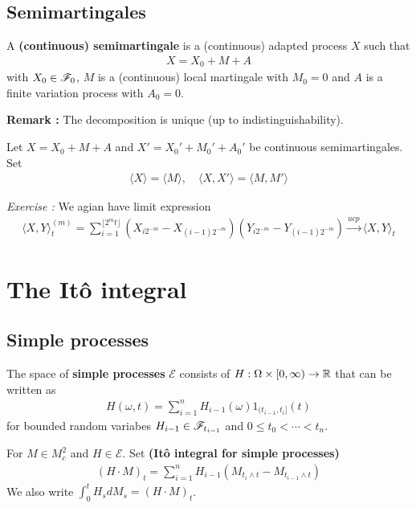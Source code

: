 \documentclass[12pt,a4paper]{article}
\begin{document}
\subsection{Semimartingales}

 A \textbf{(continuous) semimartingale} is a (continuous) adapted process $X$ such that 
\begin{align*}
X = X_0 + M +A
\end{align*}
with $X_0 \in \mathscr{F}_0$, $M$ is a (continuous) local martingale with $M_0 =0$ and $A$ is a finite variation process with $A_0 =0$.
\s

\textbf{Remark :} The decomposition is unique (up to indistinguishability).
\s

 Let $X = X_0 + M +A$ and $X' = X_0' + M_0' + A_0'$ be continuous semimartingales. Set 
\begin{align*}
\langle X \rangle = \langle M \rangle, \quad \langle X, X' \rangle = \langle M, M' \rangle
\end{align*}
\s

\emph{Exercise :} We agian have limit expression
\begin{align*}
\langle X, Y \rangle_{t}^{(m)} = \sum_{i=1}^{\lfloor 2^m t\rfloor} (X_{i2^{-m}} -X_{(i-1)2^{-m}})(Y_{i2^{-m}} -Y_{(i-1)2^{-m}}) \xrightarrow{ucp} \langle X, Y \rangle_t
\end{align*}

\section{The It\^o integral}

\subsection{Simple processes}

 The space of \textbf{simple processes} $\mathscr{E}$ consists of $H : \Omega \times [0, \infty) \rightarrow \mathbb{R}$ that can be written as
\begin{align*}
H(\omega, t) = \sum_{i=1}^n H_{i-1}(\omega) 1_{(t_{i-1}, t_i]} (t)
\end{align*}
for bounded random variabes $H_{i-1} \in \mathscr{F}_{t_{i-1}}$ and $0\leq t_0 < \cdots < t_n$. 
\s

  For $M\in M^2_c$ and $H\in \mathscr{E}$. Set \textbf{(It\^o integral for simple processes)}
\begin{align*}
(H\cdot M)_t = \sum_{i=1}^n H_{i-1} (M_{t_i \wedge t} - M_{t_{i-1} \wedge t})
\end{align*}
We also write $\int_0^t H_s dM_s = (H\cdot M)_t$.
\end{document}
